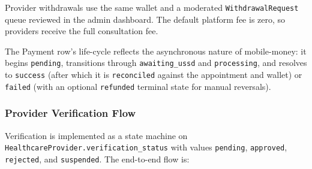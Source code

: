 Provider withdrawals use the same wallet and a moderated \texttt{WithdrawalRequest} queue reviewed in the admin dashboard. The default platform fee is zero, so providers receive the full consultation fee.

The Payment row's life-cycle reflects the asynchronous nature of mobile-money: it begins \texttt{pending}, transitions through \texttt{awaiting\_ussd} and \texttt{processing}, and resolves to \texttt{success} (after which it is \texttt{reconciled} against the appointment and wallet) or \texttt{failed} (with an optional \texttt{refunded} terminal state for manual reversals).

\subsubsection*{Provider Verification Flow}

Verification is implemented as a state machine on \texttt{HealthcareProvider.verification\_status} with values \texttt{pending}, \texttt{approved}, \texttt{rejected}, and \texttt{suspended}. The end-to-end flow is:

